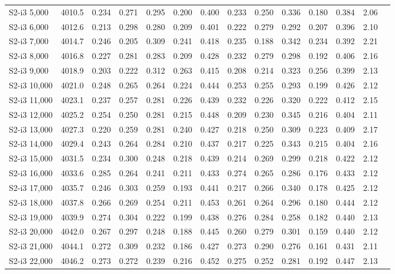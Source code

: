 \begin{longtable}{lrcccccccccccc}
S2-i3 5,000 & 4010.5 & 0.234 & 0.271 & 0.295 & 0.200 & 0.400 & 0.233 & 0.250 & 0.336 & 0.180 & 0.384 & 2.06 \\
S2-i3 6,000 & 4012.6 & 0.213 & 0.298 & 0.280 & 0.209 & 0.401 & 0.222 & 0.279 & 0.292 & 0.207 & 0.396 & 2.10 \\
S2-i3 7,000 & 4014.7 & 0.246 & 0.205 & 0.309 & 0.241 & 0.418 & 0.235 & 0.188 & 0.342 & 0.234 & 0.392 & 2.21 \\
S2-i3 8,000 & 4016.8 & 0.227 & 0.281 & 0.283 & 0.209 & 0.428 & 0.232 & 0.279 & 0.298 & 0.192 & 0.406 & 2.16 \\
S2-i3 9,000 & 4018.9 & 0.203 & 0.222 & 0.312 & 0.263 & 0.415 & 0.208 & 0.214 & 0.323 & 0.256 & 0.399 & 2.13 \\
S2-i3 10,000 & 4021.0 & 0.248 & 0.265 & 0.264 & 0.224 & 0.444 & 0.253 & 0.255 & 0.293 & 0.199 & 0.426 & 2.12 \\
S2-i3 11,000 & 4023.1 & 0.237 & 0.257 & 0.281 & 0.226 & 0.439 & 0.232 & 0.226 & 0.320 & 0.222 & 0.412 & 2.15 \\
S2-i3 12,000 & 4025.2 & 0.254 & 0.250 & 0.281 & 0.215 & 0.448 & 0.209 & 0.230 & 0.345 & 0.216 & 0.404 & 2.11 \\
S2-i3 13,000 & 4027.3 & 0.220 & 0.259 & 0.281 & 0.240 & 0.427 & 0.218 & 0.250 & 0.309 & 0.223 & 0.409 & 2.17 \\
S2-i3 14,000 & 4029.4 & 0.243 & 0.264 & 0.284 & 0.210 & 0.437 & 0.217 & 0.225 & 0.343 & 0.215 & 0.404 & 2.16 \\
S2-i3 15,000 & 4031.5 & 0.234 & 0.300 & 0.248 & 0.218 & 0.439 & 0.214 & 0.269 & 0.299 & 0.218 & 0.422 & 2.12 \\
S2-i3 16,000 & 4033.6 & 0.285 & 0.264 & 0.241 & 0.211 & 0.433 & 0.274 & 0.265 & 0.286 & 0.176 & 0.433 & 2.12 \\
S2-i3 17,000 & 4035.7 & 0.246 & 0.303 & 0.259 & 0.193 & 0.441 & 0.217 & 0.266 & 0.340 & 0.178 & 0.425 & 2.12 \\
S2-i3 18,000 & 4037.8 & 0.266 & 0.269 & 0.254 & 0.211 & 0.453 & 0.261 & 0.264 & 0.296 & 0.180 & 0.444 & 2.12 \\
S2-i3 19,000 & 4039.9 & 0.274 & 0.304 & 0.222 & 0.199 & 0.438 & 0.276 & 0.284 & 0.258 & 0.182 & 0.440 & 2.13 \\
S2-i3 20,000 & 4042.0 & 0.267 & 0.297 & 0.248 & 0.188 & 0.445 & 0.260 & 0.279 & 0.301 & 0.159 & 0.440 & 2.12 \\
S2-i3 21,000 & 4044.1 & 0.272 & 0.309 & 0.232 & 0.186 & 0.427 & 0.273 & 0.290 & 0.276 & 0.161 & 0.431 & 2.11 \\
S2-i3 22,000 & 4046.2 & 0.273 & 0.272 & 0.239 & 0.216 & 0.452 & 0.275 & 0.252 & 0.281 & 0.192 & 0.447 & 2.13 \\

\end{longtable}
